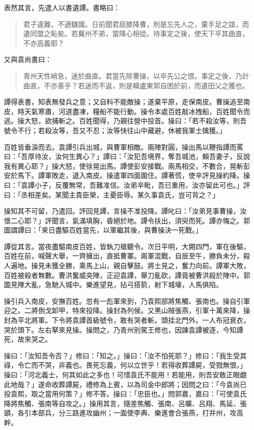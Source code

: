 表然其言，先遣人以書遺譚。書略曰：

\begin{quote}
君子違難，不適讎國。日前聞君屈膝降曹，則是忘先人之，棄手足之誼，而遺同盟之恥矣。若冀州不弟，當降心相從。待事定之後，使天下平其曲直，不亦高義耶？
\end{quote}

又與袁尚書曰：

\begin{quote}
青州天性峭急，迷於曲直。君當先除曹操，以卒先公之恨。事定之後，乃計曲直，不亦善乎？若迷而不返，則是韓盧東郭自困於前，而遺田父之獲也。
\end{quote}

譚得表書，知表無發兵之意；又自料不能敵操；遂棄平原，走保南皮。曹操追至南皮，時天氣寒肅，河道盡凍，糧船不能行動。操令本處百姓敲冰拽船，百姓聞令而逃。操大怒，欲捕斬之。百姓聞得，乃親往營中投首。操曰：「若不殺汝等，則吾號令不行；若殺汝等，吾又不忍；汝等快往山中藏避，休被我軍士擒獲。」

百姓皆垂淚而去。袁譚引兵出城，與曹軍相敵。兩陣對圓，操出馬以鞭指譚而罵曰：「吾厚待汝，汝何生異心？」譚曰：「汝犯吾境界，奪吾城池，賴吾妻子，反說我有異心耶？」操大怒，使徐晃出馬。譚使彭安接戰。兩馬相交，不數合，晃斬彭安於馬下。譚軍敗走，退入南皮。操遣軍四面圍住。譚著慌，使辛評見操約降。操曰：「袁譚小子，反覆無常，吾難准信。汝弟辛毗，吾已重用，汝亦留此可也。」評曰：「丞相差矣。某聞主貴臣榮，主憂臣辱。某久事袁氏，豈可背之？」

操知其不可留，乃遣回。評回見譚，言操不准投降。譚叱曰：「汝弟見事曹操，汝懷二心耶？」評聞言，氣滿填胸，昏絕於地。譚令扶出，須臾而死。譚亦悔之。郭圖謂譚曰：「來日盡驅百姓當先，以軍繼其後，與曹操決一死戰。」

譚從其言。當夜盡驅南皮百姓，皆執刀槍聽令。次日平明，大開四門，軍在後驅，百姓在前，喊聲大舉，一齊擁出，直抵曹寨。兩軍混戰，自辰至午，勝負未分，殺人遍地。操見未獲全勝，乘馬上山，親自擊鼓。將士見之，奮力向前。譚軍大敗，百姓被殺者無數。曹洪奮威突陣，正迎袁譚，舉刀亂砍，譚竟被曹洪殺於陣中。郭圖見陣大亂，急馳入城中。樂進望見，拈弓搭箭，射下城壕，人馬俱陷。

操引兵入南皮，安撫百姓。忽有一彪軍來到，乃袁熙部將焦觸、張南也。操自引軍迎之。二將倒戈卸甲，特來投降。操封為列侯。又黑山賊張燕，引軍十萬來降，操封為平北將軍。下令將袁譚首級號令，敢有哭者斬。頭挂北門外。一人布冠衰衣，哭於頭下。左右拏來見操。操問之，乃青州別駕王修也，因諫袁譚被逐，今知譚死，故來哭之。

操曰：「汝知吾令否？」修曰：「知之。」操曰：「汝不怕死耶？」修曰：「我生受其祿，令亡而不哭，非義也。畏死忘義，何以立世乎！若得收葬譚屍，受戮無恨。」操曰：「河北義士，何其如此之多也！可惜袁氏不能用！若能用，則吾安敢正眼覷此地哉？」遂命收葬譚屍，禮修為上賓，以為司金中郎將；因問之曰：「今袁尚已投袁熙，取之當用何策？」修不答。操曰：「忠臣也。」問郭嘉，嘉曰：「可使袁氏降將焦觸、張南等自攻之。」操用其言，隨差焦觸、張南、呂曠、呂翔、馬延、張顗，各引本部兵，分三路進攻幽州；一面使李典、樂進會合張燕，打并州，攻高幹。

